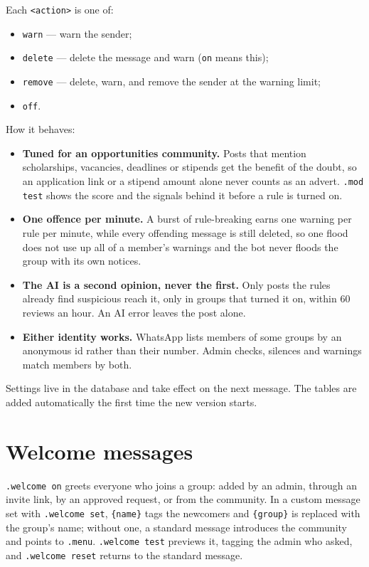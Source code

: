 \documentclass[11pt,a4paper]{report}
\newcommand{\dash}{---}
\begin{document}
Each \texttt{<action>} is one of:

\begin{itemize}
  \item \texttt{warn} \dash{} warn the sender;
  \item \texttt{delete} \dash{} delete the message and warn (\texttt{on} means
        this);
  \item \texttt{remove} \dash{} delete, warn, and remove the sender at the
        warning limit;
  \item \texttt{off}.
\end{itemize}

How it behaves:

\begin{itemize}
  \item \textbf{Tuned for an opportunities community.} Posts that mention
        scholarships, vacancies, deadlines or stipends get the benefit of the
        doubt, so an application link or a stipend amount alone never counts
        as an advert. \texttt{.mod test} shows the score and the signals behind
        it before a rule is turned on.
  \item \textbf{One offence per minute.} A burst of rule-breaking earns one
        warning per rule per minute, while every offending message is still
        deleted, so one flood does not use up all of a member's warnings and
        the bot never floods the group with its own notices.
  \item \textbf{The AI is a second opinion, never the first.} Only posts the
        rules already find suspicious reach it, only in groups that turned it
        on, within 60 reviews an hour. An AI error leaves the post alone.
  \item \textbf{Either identity works.} WhatsApp lists members of some groups
        by an anonymous id rather than their number. Admin checks, silences
        and warnings match members by both.
\end{itemize}

Settings live in the database and take effect on the next message. The tables
are added automatically the first time the new version starts.

\section{Welcome messages}

\texttt{.welcome on} greets everyone who joins a group: added by an admin,
through an invite link, by an approved request, or from the community. In a
custom message set with \texttt{.welcome set}, \texttt{\{name\}} tags the
newcomers and \texttt{\{group\}} is replaced with the group's name; without
one, a standard message introduces the community and points to
\texttt{.menu}. \texttt{.welcome test} previews it, tagging the admin who
asked, and \texttt{.welcome reset} returns to the standard message.
\end{document}

